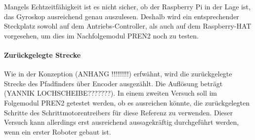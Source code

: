 \documentclass[main.tex]{subfiles} %
\begin{document}
Mangels Echtzeitfähigkeit ist es nicht sicher, ob der Raspberry Pi in der Lage
ist, das Gyroskop ausreichend genau auszulesen. Deshalb wird ein entsprechender
Steckplatz sowohl auf dem Antriebs-Controller, als auch auf dem Raspberry-HAT
vorgesehen, um dies im Nachfolgemodul PREN2 noch zu testen.

\paragraph{Zurückgelegte Strecke}
Wie in der Konzeption (ANHANG !!!!!!!!!) erfwähnt, wird die zurückgelegte
Strecke des Pfadfinders über Encoder ausgezählt. Die Auflösung beträgt (YANNIK
LOCHSCHEIBE???????). In einem zweiten Versuch soll im Folgemodul PREN2 getestet
werden, ob es ausreichen könnte, die zurückgelegten Schritte des
Schrittmotorentreibers für diese Referenz zu verwenden. Dieser Versuch kann
allerdings erst ausreichend aussagekräftig durchgeführt werden, wenn ein erster
Roboter gebaut ist. 
\end{document}
